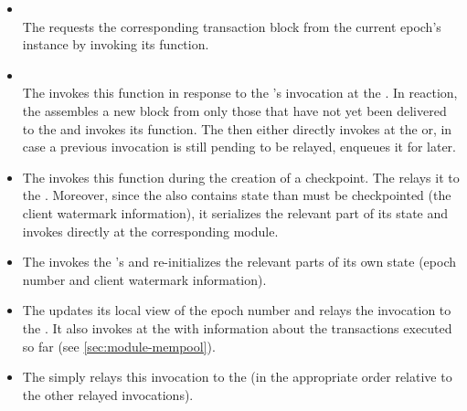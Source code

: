 \documentclass{article}
\begin{document}
\begin{itemize}

    \item {}\\
    The  requests the corresponding transaction block from the current epoch's  instance
    by invoking its  function.

    \item {}\\
    The  invokes this function in response to the 's  invocation at the .
    In reaction, the  assembles a new block from only those 
    that have not yet been delivered to the  and invokes its  function.
    The  then either directly invokes  at the 
    or, in case a previous invocation is still pending to be relayed, enqueues it for later.

    \item {}
    The  invokes this function during the creation of a checkpoint.
    The  relays it to the .
    Moreover, since the  also contains state than must be checkpointed (the client watermark information),
    it serializes the relevant part of its state and invokes  directly at the corresponding  module.

    \item {}
    The  invokes the 's  and re-initializes the relevant parts of its own state
    (epoch number and client watermark information).

    \item {}
    The  updates its local view of the epoch number and relays the invocation to the .
    It also invokes  at the  with information about the transactions executed so far (see \cref{sec:module-mempool}).
    
    \item {}
    The  simply relays this invocation to the  (in the appropriate order relative to the other relayed invocations).

\end{itemize}
\end{document}
